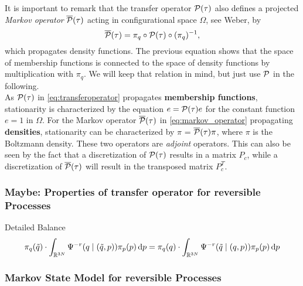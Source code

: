 It is important to remark that the transfer operator $\mathcal{P}(\tau)$ also defines a
projected \textit{Markov operator}  $\overline{\mathcal{P}} (\tau)$ acting in configurational space $\Omega$, see Weber\cite{weber2011subspace}, by
\begin{equation}
\label{eq:markov_operator}
\overline{\mathcal{P}} (\tau) = \pi_q \circ \mathcal{P}(\tau) \circ (\pi_q)^{-1},
\end{equation}
which propagates density functions.
The previous equation shows that the space of membership functions is connected to the space of density functions by multiplication with $\pi_q$.
We will keep that relation in mind, but just use $\mathcal{P}$ in the following.
\\

As $\mathcal{P}(\tau)$ in \eqref{eq:transferoperator} propagates \textbf{membership functions}, stationarity is characterized by the equation $e=\mathcal{P}(\tau)e$ for the constant function $e = 1$ in $\Omega$. For the Markov operator $\overline{\mathcal{P}} (\tau) $ in \eqref{eq:markov_operator} propagating \textbf{densities}, stationarity can be characterized by $\pi$ = $\overline{\mathcal{P}} (\tau) \pi$, where $\pi$ is the Boltzmann density. 
These two operators are \textit{adjoint} operators. This can also be seen by the fact that a discretization of $\mathcal{P}(\tau)$ results in a matrix $P_c$, while a discretization of $\overline{\mathcal{P}} (\tau)$ will result in the transposed matrix $P_c^T$.

\subsubsection*{Maybe: Properties of transfer operator for reversible Processes}
Detailed Balance
\begin{equation}
\label{eq:detailed_balance}
\pi_q (\tilde{q}) \cdot \int_{\mathbb{R}^{3N}} \Psi^{-r}(q \mid (\tilde{q},p)) \pi_p(p)\mathop{}\!\mathrm{d} p 
	= \pi_q(q) \cdot \int_{\mathbb{R}^{3N}} \Psi^{-r}(\tilde{q}\mid (q,p)) \pi_p(p)\mathop{}\!\mathrm{d} p
\end{equation}

\subsubsection*{Markov State Model for reversible Processes}

